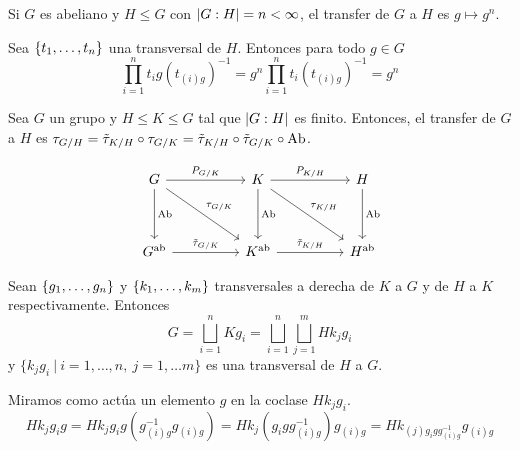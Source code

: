 \begin{ejemplo}
	Si $G$ es abeliano y $H\leq G$ con $\left|G:H\right| = n < \infty$, el transfer de $G$ a $H$ es $g \mapsto g^n$.
	\begin{demostracion}
		Sea $\{t_1,\ldots,t_n\}$ una transversal de $H$. Entonces para todo $g\in G$
		\begin{equation*}
			\prod_{i=1}^n t_ig(t_{(i)g})^{-1} = g^n \prod_{i=1}^n t_i(t_{(i)g})^{-1} = g^n
		\end{equation*}
	\end{demostracion}
\end{ejemplo}

\begin{proposicion}
	Sea $G$ un grupo y $H\leq K \leq G$ tal que $\left|G:H\right|$ es finito. Entonces, el transfer de $G$ a $H$ es $\tau_{G/ H} = \tilde\tau_{K/ H} \circ \tau_{G/ K} = \tilde\tau_{K/ H} \circ \tilde\tau_{G/ K} \circ \operatorname{Ab}$.
	
	
\[\begin{tikzcd}
	G && K && H \\
	\\
	{\Ab G} && {\Ab K} && {\Ab H}
	\arrow["{\pretransfer G K}", from=1-1, to=1-3]
	\arrow["{\pretransfer K H}", from=1-3, to=1-5]
	\arrow["\AbFunctor", from=1-1, to=3-1]
	\arrow["\AbFunctor", from=1-3, to=3-3]
	\arrow["\AbFunctor", from=1-5, to=3-5]
	\arrow["{\ptransfer G K}", from=3-1, to=3-3]
	\arrow["{\ptransfer K H}", from=3-3, to=3-5]
	\arrow["{\transfer G K}", from=1-1, to=3-3]
	\arrow["{\transfer K H}", from=1-3, to=3-5]
\end{tikzcd}\]
	\begin{demostracion}
		Sean $\{g_1,\ldots,g_n\}$ y $\{k_1,\ldots,k_m\}$ transversales a derecha de $K$ a $G$ y de $H$ a $K$ respectivamente. Entonces 
		\begin{equation*}
			G = \bigsqcup_{i=1}^{n} K g_i = \bigsqcup_{i=1}^n\bigsqcup_{j=1}^m Hk_jg_i
		\end{equation*}
		y $\{k_jg_i \ | \ i=1,\ldots,n, \ j=1,\ldots m\}$ es una transversal de $H$ a $G$.
		
		Miramos como actúa un elemento $g$ en la coclase $Hk_jg_i$. 
		\begin{equation}\label{eq:transact}
			Hk_jg_ig = Hk_j g_ig(g_{(i)g}^{-1}g_{(i)g}) = Hk_{j} (g_igg_{(i)g}^{-1})g_{(i)g} = Hk_{(j)g_igg_{(i)g}^{-1}}g_{(i)g} %
		\end{equation}
		

\end{demostracion}
\end{proposicion}
